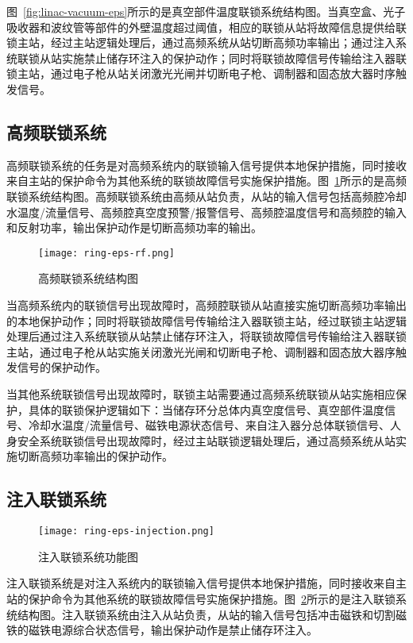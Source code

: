 图~\ref{fig:linac-vacuum-eps}所示的是真空部件温度联锁系统结构图。当真空盒、光子吸收器和波纹管等部件的外壁温度超过阈值，相应的联锁从站将故障信息提供给联锁主站，经过主站逻辑处理后，通过高频系统从站切断高频功率输出；通过注入系统联锁从站实施禁止储存环注入的保护动作；同时将联锁故障信号传输给注入器联锁主站，通过电子枪从站关闭激光光闸并切断电子枪、调制器和固态放大器时序触发信号。

\subsection{高频联锁系统}

高频联锁系统的任务是对高频系统内的联锁输入信号提供本地保护措施，同时接收来自主站的保护命令为其他系统的联锁故障信号实施保护措施。图~\ref{fig:ring-eps-rf}所示的是高频联锁系统结构图。高频联锁系统由高频从站负责，从站的输入信号包括高频腔冷却水温度/流量信号、高频腔真空度预警/报警信号、高频腔温度信号和高频腔的输入和反射功率，输出保护动作是切断高频功率的输出。

\begin{figure}[!htb]
	\centering
	\texttt{[image: ring-eps-rf.png]}
	\caption{高频联锁系统结构图}
	\label{fig:ring-eps-rf}
\end{figure}

当高频系统内的联锁信号出现故障时，高频腔联锁从站直接实施切断高频功率输出的本地保护动作；同时将联锁故障信号传输给注入器联锁主站，经过联锁主站逻辑处理后通过注入系统联锁从站禁止储存环注入，将联锁故障信号传输给注入器联锁主站，通过电子枪从站实施关闭激光光闸和切断电子枪、调制器和固态放大器序触发信号的保护动作。

当其他系统联锁信号出现故障时，联锁主站需要通过高频系统联锁从站实施相应保护，具体的联锁保护逻辑如下：当储存环分总体内真空度信号、真空部件温度信号、冷却水温度/流量信号、磁铁电源状态信号、来自注入器分总体联锁信号、人身安全系统联锁信号出现故障时，经过主站联锁逻辑处理后，通过高频系统从站实施切断高频功率输出的保护动作。


\subsection{注入联锁系统}

\begin{figure}[!htb]
	\centering
	\texttt{[image: ring-eps-injection.png]}
	\caption{注入联锁系统功能图}
	\label{fig:ring-eps-injection}
\end{figure}

注入联锁系统是对注入系统内的联锁输入信号提供本地保护措施，同时接收来自主站的保护命令为其他系统的联锁故障信号实施保护措施。图~\ref{fig:ring-eps-injection}所示的是注入联锁系统结构图。注入联锁系统由注入从站负责，从站的输入信号包括冲击磁铁和切割磁铁的磁铁电源综合状态信号，输出保护动作是禁止储存环注入。

